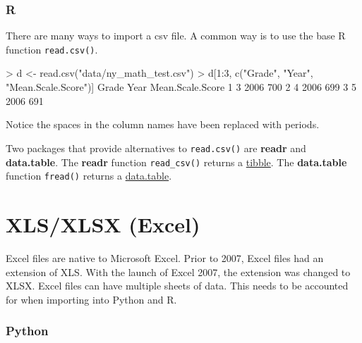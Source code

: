 \documentclass[
]{book}
\newenvironment{Shaded}{\begin{snugshade}}{\end{snugshade}}
\newcommand{\DecValTok}[1]{\textcolor[rgb]{0.00,0.00,0.81}{#1}}
\newcommand{\FunctionTok}[1]{\textcolor[rgb]{0.00,0.00,0.00}{#1}}
\newcommand{\NormalTok}[1]{#1}
\newcommand{\OtherTok}[1]{\textcolor[rgb]{0.56,0.35,0.01}{#1}}
\newcommand{\SpecialCharTok}[1]{\textcolor[rgb]{0.00,0.00,0.00}{#1}}
\newcommand{\StringTok}[1]{\textcolor[rgb]{0.31,0.60,0.02}{#1}}
\begin{document}
\hypertarget{r-12}{%
\subsubsection*{R}\label{r-12}}

There are many ways to import a csv file. A common way is to use the base R function \texttt{read.csv()}.

\begin{Shaded}
\begin{Highlighting}[]
\SpecialCharTok{\textgreater{}}\NormalTok{ d }\OtherTok{\textless{}{-}} \FunctionTok{read.csv}\NormalTok{(}\StringTok{"data/ny\_math\_test.csv"}\NormalTok{)}
\SpecialCharTok{\textgreater{}}\NormalTok{ d[}\DecValTok{1}\SpecialCharTok{:}\DecValTok{3}\NormalTok{, }\FunctionTok{c}\NormalTok{(}\StringTok{"Grade"}\NormalTok{, }\StringTok{"Year"}\NormalTok{, }\StringTok{"Mean.Scale.Score"}\NormalTok{)]}
\NormalTok{  Grade Year Mean.Scale.Score}
\DecValTok{1}     \DecValTok{3} \DecValTok{2006}              \DecValTok{700}
\DecValTok{2}     \DecValTok{4} \DecValTok{2006}              \DecValTok{699}
\DecValTok{3}     \DecValTok{5} \DecValTok{2006}              \DecValTok{691}
\end{Highlighting}
\end{Shaded}

Notice the spaces in the column names have been replaced with periods.

Two packages that provide alternatives to \texttt{read.csv()} are \textbf{readr} and \textbf{data.table}. The \textbf{readr} function \texttt{read\_csv()} returns a \href{https://r4ds.had.co.nz/tibbles.html}{tibble}. The \textbf{data.table} function \texttt{fread()} returns a \href{https://rdatatable.gitlab.io/data.table/articles/datatable-intro.html}{data.table}.

\hypertarget{xlsxlsx-excel}{%
\section{XLS/XLSX (Excel)}\label{xlsxlsx-excel}}

Excel files are native to Microsoft Excel. Prior to 2007, Excel files had an extension of XLS. With the launch of Excel 2007, the extension was changed to XLSX. Excel files can have multiple sheets of data. This needs to be accounted for when importing into Python and R.

\hypertarget{python-13}{%
\subsubsection*{Python}\label{python-13}}
\end{document}
